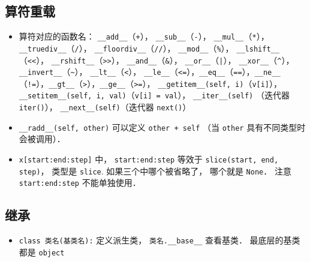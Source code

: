 \subsection{算符重载}
\begin{itemize}
\item 算符对应的函数名： \verb|__add__|（\verb|+|）， \verb|__sub__|（\verb|-|）， \verb|__mul__|（\verb|*|）， \verb|__truediv__|（\verb|/|）， \verb|__floordiv__|（\verb|//|）， \verb|__mod__|（\verb|%|）， \verb|__lshift__|（\verb|<<|）， \verb|__rshift__|（\verb|>>|）， \verb|__and__|（\verb|&|）， \verb|__or__|（\verb`|`）， \verb|__xor__|（\verb|^|）， \verb|__invert__|（\verb|~|）， \verb|__lt__|（\verb|<|）， \verb|__le__|（\verb|<=|），\verb|__eq__|（\verb|==|），\verb|__ne__|（\verb|!=|），\verb|__gt__|（\verb|>|），\verb|__ge__|（\verb|>=|）， \verb|__getitem__(self, i)|（\verb|v[i]|）， \verb|__setitem__(self, i, val)|（\verb|v[i] = val|）， \verb|__iter__(self)| （迭代器 \verb|iter()|）， \verb|__next__(self)|（迭代器 \verb|next()|）
\item \verb|__radd__(self, other)| 可以定义 \verb|other + self| （当 \verb|other| 具有不同类型时会被调用）．
\item \verb|x[start:end:step]| 中， \verb|start:end:step| 等效于 \verb|slice(start, end, step)|， 类型是 \verb|slice|. 如果三个中哪个被省略了， 哪个就是 \verb|None|． 注意 \verb|start:end:step| 不能单独使用．
\end{itemize}

\subsection{继承}
\begin{itemize}
\item \verb|class 类名(基类名):| 定义派生类， \verb|类名.__base__| 查看基类． 最底层的基类都是 \verb|object|
\end{itemize}
